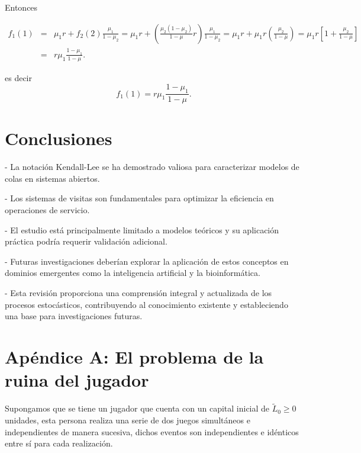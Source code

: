 \documentclass{article}
\numberwithin{equation}{section}
\begin{document}
Entonces

\begin{eqnarray*}
f_{1}\left(1\right)&=&\mu_{1}r+f_{2}\left(2\right)\frac{\mu_{1}}{1-\mu_{2}}=\mu_{1}r+\left(\frac{\mu_{2}\left(1-\mu_{2}\right)}{1-\mu}r\right)\frac{\mu_{1}}{1-\mu_{2}}=\mu_{1}r+\mu_{1}r\left(\frac{\mu_{2}}{1-\mu}\right)=\mu_{1}r\left[1+\frac{\mu_{2}}{1-\mu}\right]\\
&=&r\mu_{1}\frac{1-\mu_{1}}{1-\mu}.
\end{eqnarray*}

es decir
\begin{equation}
f_{1}\left(1\right)=r\mu_{1}\frac{1-\mu_{1}}{1-\mu}.
\end{equation}

\section*{Conclusiones}

- La notación Kendall-Lee se ha demostrado valiosa para caracterizar modelos de colas en sistemas abiertos.

- Los sistemas de visitas son fundamentales para optimizar la eficiencia en operaciones de servicio.

- El estudio está principalmente limitado a modelos teóricos y su aplicación práctica podría requerir validación adicional.

- Futuras investigaciones deberían explorar la aplicación de estos conceptos en dominios emergentes como la inteligencia artificial y la bioinformática.

- Esta revisión proporciona una comprensión integral y actualizada de los procesos estocásticos, contribuyendo al conocimiento existente y estableciendo una base para investigaciones futuras.


\section*{Ap\'endice A: El problema de la ruina del jugador}

Supongamos que se tiene un jugador que cuenta con un capital inicial de $\tilde{L}_{0}\geq0$ unidades, esta persona realiza una serie de dos juegos simult\'aneos e independientes de manera sucesiva, dichos eventos son independientes e id\'enticos entre s\'i para cada realizaci\'on.\\
\end{document}
